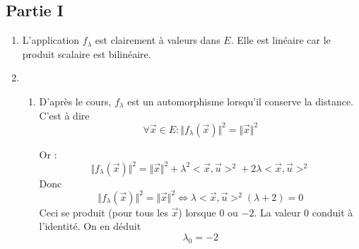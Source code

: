\subsection*{Partie I}
\begin{enumerate}
 \item L'application $f_\lambda$ est clairement à valeurs dans $E$. Elle est linéaire car le produit scalaire est bilinéaire.

 \item \begin{enumerate}
 \item D'après le cours, $f_\lambda$ est un automorphisme lorsqu'il conserve la distance. C'est à dire
\begin{displaymath}
 \forall \overrightarrow x \in E :  
\Vert f_\lambda(\overrightarrow x)\Vert^2 = \Vert \overrightarrow x \Vert^2
\end{displaymath}

Or :
\begin{displaymath}
 \Vert f_\lambda(\overrightarrow x)\Vert^2 = 
\Vert \overrightarrow x \Vert^2 + \lambda^2 <\overrightarrow x, \overrightarrow u>^2 + 2\lambda <\overrightarrow x, \overrightarrow u>^2
\end{displaymath}
Donc
\begin{displaymath}
 \Vert f_\lambda(\overrightarrow x)\Vert^2 = \Vert \overrightarrow x \Vert^2 \Leftrightarrow
\lambda <\overrightarrow x, \overrightarrow u>^2 \left(\lambda + 2\right) =0
\end{displaymath}
Ceci se produit (pour tous les $\overrightarrow x$) lorsque $0$ ou $-2$. La valeur $0$ conduit à l'identité. On en déduit
\begin{displaymath}
 \lambda_0 = -2
\end{displaymath}


\end{enumerate}
\end{enumerate}
